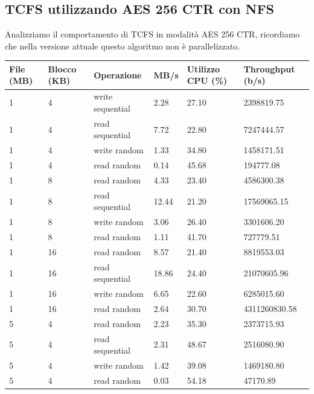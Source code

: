 \subsection{TCFS utilizzando AES 256 CTR con NFS}
Analizziamo il comportamento di TCFS in modalità AES 256 CTR, ricordiamo che nella versione attuale questo algoritmo non è parallelizzato.
\begin{tabularx}{\textwidth}{|X|X|X|X|X|X|}
    \hline
    \textbf{File (MB)} & \textbf{Blocco (KB)} & \textbf{Operazione} & \textbf{MB/s} & \textbf{Utilizzo CPU (\%)} & \textbf{Throughput (b/s)} \\
    \hline
    \endhead
    \rowcolor{lightgray} 1 & 4 & write sequential & 2.28 & 27.10 & 2398819.75 \\
    \hline
    \rowcolor{lightgray} 1 & 4 & read sequential & 7.72 & 22.80 & 7247444.57 \\
    \hline
    \rowcolor{lightgray} 1 & 4 & write random & 1.33 & 34.80 & 1458171.51 \\
    \hline
    \rowcolor{lightgray} 1 & 4 & read random & 0.14 & 45.68 & 194777.08 \\
    \hline
    \hline
    1 & 8 & read random & 4.33 & 23.40 & 4586300.38\\ 
    \hline
    1 & 8 & read sequential & 12.44 & 21.20 & 17569065.15 \\ 
    \hline
    1 & 8 & write random & 3.06 & 26.40 & 3301606.20 \\
    \hline
    1 & 8 & read random & 1.11 & 41.70 & 727779.51 \\
    \hline
    \hline
    \rowcolor{lightgray} 1 & 16 & read random & 8.57 & 21.40 & 8819553.03 \\
    \hline
    \rowcolor{lightgray} 1 & 16 & read sequential & 18.86 & 24.40 & 21070605.96 \\ 
    \hline
    \rowcolor{lightgray} 1 & 16 & write random & 6.65 & 22.60 & 6285015.60 \\
    \hline
    \rowcolor{lightgray} 1 & 16 & read random & 2.64 & 30.70 & 4311260830.58 \\
    \hline
    \hline
    5 & 4 & read random & 2.23 & 35.30 & 2373715.93 \\
    \hline
    5 & 4 & read sequential & 2.31 & 48.67 & 2516080.90 \\
    \hline
    5 & 4 & write random & 1.42 & 39.08 & 1469180.80 \\
    \hline
    5 & 4 & read random & 0.03 & 54.18 & 47170.89 \\
    \hline

\end{tabularx}

